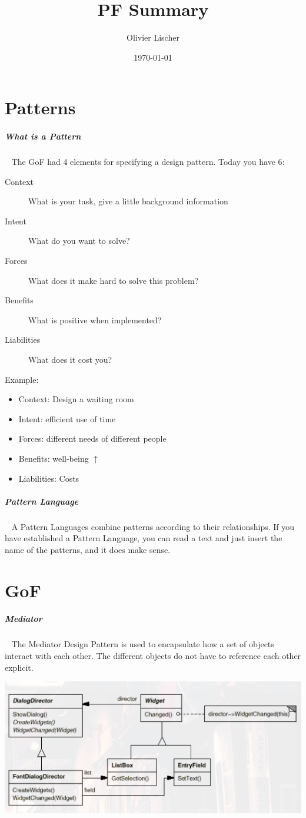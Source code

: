 \documentclass[11pt,twoside,landscape]{article}
\author{Olivier Lischer}
\date{\today}
\title{PF Summary}
\begin{document}
\pagestyle{fancy}
\fancyhf{}
\fancyfoot[CE,CO]{\leftmark}
\fancyfoot[R]{\thepage}

\tableofcontents
\newpage

\begin{multicols}{3}
\section{Patterns}
\label{sec:org7f35119}
\subparagraph{What is a Pattern} \
\label{sec:org5d5d5ff}
The GoF had 4 elements for specifying a design pattern.
Today you have 6:
\begin{description}
\item[{Context}] What is your task, give a little background information
\item[{Intent}] What do you want to solve?
\item[{Forces}] What does it make hard to solve this problem?
\item[{Benefits}] What is positive when implemented?
\item[{Liabilities}] What does it cost you?
\end{description}


Example:
\begin{itemize}
\item Context: Design a waiting room
\item Intent: efficient use of time
\item Forces: different needs of different people
\item Benefits: well-being \(\uparrow\)
\item Liabilities: Costs
\end{itemize}
\subparagraph{Pattern Language} \
\label{sec:orgcf27c29}
A Pattern Languages combine patterns according to their relationships.
If you have established a Pattern Language, you can read a text and just insert the name of the patterns, and it does make sense.
\section{GoF}
\label{sec:org93f9d38}
\subparagraph{Mediator} \
\label{sec:orgdfc4f90}
The Mediator Design Pattern is used to encapsulate how a set of objects interact with each other.
The different objects do not have to reference each other explicit.

{
\begin{center}
\includegraphics[width=.9\linewidth]{img/mediator.png}
\end{center}
\label{fig:mediator-class-diagram}
}


\end{multicols}
\end{document}
